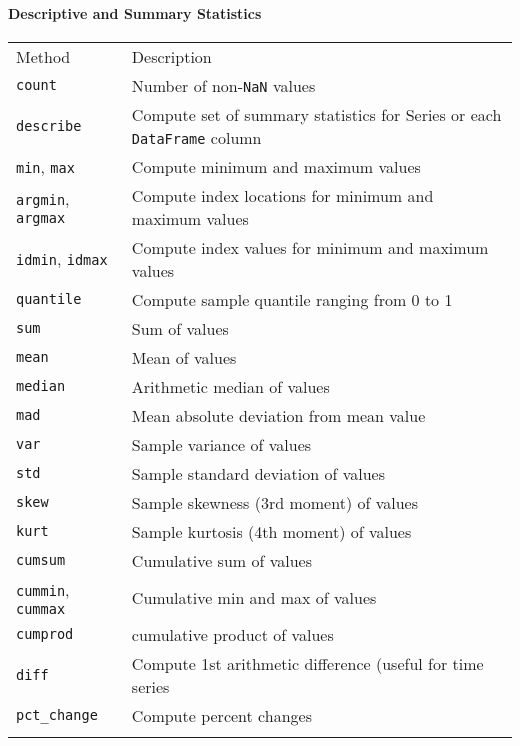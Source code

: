\documentclass{article}
\begin{document}
    \paragraph{Descriptive and Summary
Statistics}\label{descriptive-and-summary-statistics}

\begin{longtable}[c]{@{}ll@{}}
\toprule\addlinespace
Method & Description
\\\addlinespace
\midrule\endhead
\texttt{count} & Number of non-\texttt{NaN} values
\\\addlinespace
\texttt{describe} & Compute set of summary statistics for Series or each
\texttt{DataFrame} column
\\\addlinespace
\texttt{min}, \texttt{max} & Compute minimum and maximum values
\\\addlinespace
\texttt{argmin}, \texttt{argmax} & Compute index locations for minimum
and maximum values
\\\addlinespace
\texttt{idmin}, \texttt{idmax} & Compute index values for minimum and
maximum values
\\\addlinespace
\texttt{quantile} & Compute sample quantile ranging from 0 to 1
\\\addlinespace
\texttt{sum} & Sum of values
\\\addlinespace
\texttt{mean} & Mean of values
\\\addlinespace
\texttt{median} & Arithmetic median of values
\\\addlinespace
\texttt{mad} & Mean absolute deviation from mean value
\\\addlinespace
\texttt{var} & Sample variance of values
\\\addlinespace
\texttt{std} & Sample standard deviation of values
\\\addlinespace
\texttt{skew} & Sample skewness (3rd moment) of values
\\\addlinespace
\texttt{kurt} & Sample kurtosis (4th moment) of values
\\\addlinespace
\texttt{cumsum} & Cumulative sum of values
\\\addlinespace
\texttt{cummin}, \texttt{cummax} & Cumulative min and max of values
\\\addlinespace
\texttt{cumprod} & cumulative product of values
\\\addlinespace
\texttt{diff} & Compute 1st arithmetic difference (useful for time
series
\\\addlinespace
\texttt{pct\_change} & Compute percent changes
\\\addlinespace
\bottomrule
\end{longtable}
\end{document}
